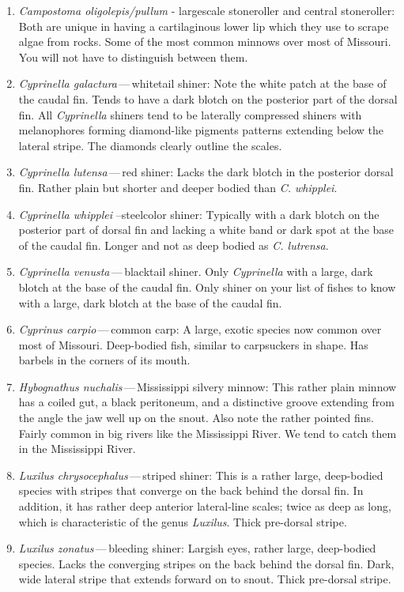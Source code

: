 \documentclass[11pt]{article}
\begin{document}
\begin{enumerate}
\item \textit{Campostoma oligolepis/pullum} - largescale stoneroller and central stoneroller:  Both are unique in having a cartilaginous lower lip which they use to scrape algae from rocks.  Some of the most common minnows over most of Missouri. You will not have to distinguish between them.
\item \textit{Cyprinella galactura}\,—\,whitetail shiner: Note the white patch at the base of the caudal fin. Tends to have a dark blotch on the posterior part of the dorsal fin.  All \textit{Cyprinella} shiners tend to be laterally compressed shiners with melanophores forming diamond-like pigments patterns extending below the lateral stripe. The diamonds clearly outline the scales.
\item \textit{Cyprinella lutensa}\,—\,red shiner: Lacks the dark blotch in the posterior dorsal fin. Rather plain but shorter and deeper bodied than \textit{C. whipplei}.
\item \textit{Cyprinella whipplei} –steelcolor shiner:  Typically with a dark blotch on the posterior part of dorsal fin and lacking a white band or dark spot at the base of the caudal fin.  Longer and not as deep bodied as \textit{C. lutrensa}.
\item \textit{Cyprinella venusta}\,—\,blacktail shiner. Only \textit{Cyprinella} with a large, dark blotch at the base of the caudal fin. Only shiner on your list of fishes to know with a large, dark blotch at the base of the caudal fin.
\item \textit{Cyprinus carpio}\,—\,common carp:  A large, exotic species now common over most of Missouri.  Deep-bodied fish, similar to carpsuckers in shape.  Has barbels in the corners of its mouth.
\item \textit{Hybognathus nuchalis}\,—\,Mississippi silvery minnow: This rather plain minnow has a coiled gut, a black peritoneum, and a distinctive groove extending from the angle the jaw well up on the snout.  Also note the rather pointed fins. Fairly common in big rivers like the Mississippi River. We tend to catch them in the Mississippi River.
\item \textit{Luxilus chrysocephalus}\,—\,striped shiner: This is a rather large, deep-bodied species with stripes that converge on the back behind the dorsal fin.  In addition, it has rather deep anterior lateral-line scales; twice as deep as long, which is characteristic of the genus \textit{Luxilus}. Thick pre-dorsal stripe.
\item \textit{Luxilus zonatus}\,—\,bleeding shiner: Largish eyes, rather large, deep-bodied species. Lacks the converging stripes on the back behind the dorsal fin. Dark, wide lateral stripe that extends forward on to snout. Thick pre-dorsal stripe.

\end{enumerate}
\end{document}
